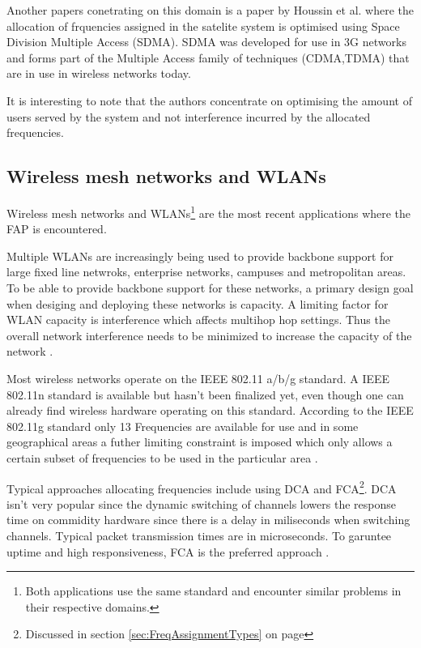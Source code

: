 Another papers conetrating on this domain is a paper by Houssin et al.\cite{SDMASatelite} where the allocation of frquencies assigned in the satelite system is optimised using Space Division Multiple Access (SDMA). SDMA was developed for use in 3G networks and forms part of the Multiple Access family of techniques (CDMA,TDMA) that are in use in wireless networks today. 

It is interesting to note that the authors concentrate on optimising the amount of users served by the system and not interference incurred by the allocated frequencies.

\subsection{Wireless mesh networks and WLANs}
Wireless mesh networks and WLANs\footnote{Both applications use the same standard and encounter similar problems in their respective domains.} are the most recent applications where the FAP is encountered. 

Multiple WLANs are increasingly being used to provide backbone support for large fixed line netwroks, enterprise networks, campuses and metropolitan areas. To be able to provide backbone support for these networks, a primary design goal when desiging and deploying these networks is capacity. A limiting factor for WLAN capacity is interference which affects multihop hop settings. Thus the overall network interference needs to be minimized to increase the capacity of the network \cite{MultiradioMeshNetworks}. 

Most wireless networks operate on the IEEE 802.11 a/b/g standard. A IEEE 802.11n standard is available but hasn't been finalized yet, even though one can already find wireless hardware operating on this standard. According to the IEEE 802.11g standard only 13 Frequencies are available for use and in some geographical areas a futher limiting constraint is imposed which only allows a certain subset of frequencies to be used in the particular area \cite{Karen2004}.

Typical approaches allocating frequencies include using DCA and FCA\footnote{Discussed in section \ref{sec:FreqAssignmentTypes} on page \pageref{sec:FreqAssignmentTypes}}. DCA isn't very popular since the dynamic switching of channels lowers the response time on commidity hardware since there is a delay in miliseconds when switching channels. Typical packet transmission times are in microseconds. To garuntee uptime and high responsiveness, FCA is the preferred approach \cite{MultiradioMeshNetworks}.

